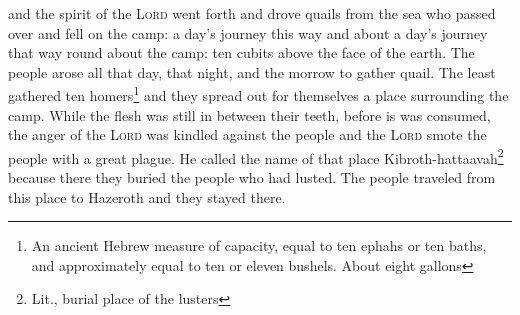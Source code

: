 \begin{enumerate}[align=center]
     and the spirit of the \textsc{Lord} went forth and drove quails from the sea who passed over and fell on the camp: a day's journey this way and about a day's journey that way round about the camp: ten cubits above the face of the earth.%
     The people arose all that day, that night, and the morrow to gather quail. The least gathered ten homers\footnote{An ancient Hebrew measure of capacity, equal to ten ephahs or ten baths, and approximately equal to ten or eleven bushels. About eight gallons} and they spread out for themselves a place surrounding the camp.%
     While the flesh was still in between their teeth, before is was consumed, the anger of the \textsc{Lord} was kindled against the people and the \textsc{Lord} smote the people with a great plague.%
     He called the name of that place Kibroth-hattaavah\footnote{Lit., burial place of the lusters} because there they buried the people who had lusted.%
     The people traveled from this place to Hazeroth and they stayed there.%
\end{enumerate}
